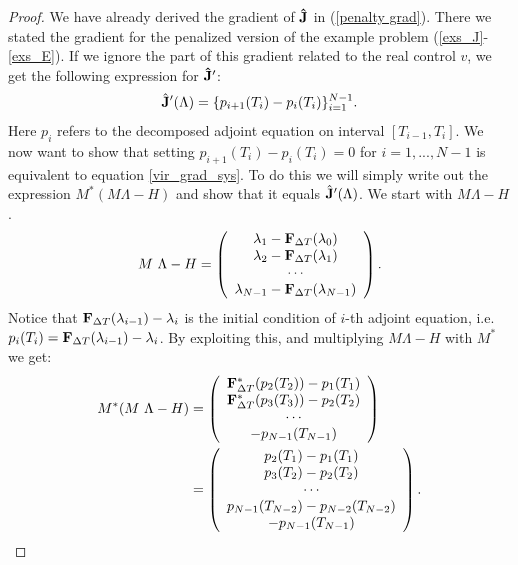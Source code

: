 \begin{proof}
We have already derived the gradient of $\bold{\hat J}$ in (\ref{penalty grad}). There we stated the gradient for the penalized version of the example problem (\ref{exs_J}-\ref{exs_E}). If we ignore the part of this gradient related to the real control $v$, we get the following expression for $\bold{\hat J}'$:
\begin{align*}
\hat{\bold J}'(\Lambda) = \{p_{i+1}(T_i)-p_{i}(T_i)\}_{i=1}^{N-1}.
\end{align*}
Here $p_i$ refers to the decomposed adjoint equation on interval $[T_{i-1},T_{i}]$. We now want to show that setting $p_{i+1}(T_i)-p_{i}(T_i)=0$ for $i=1,...,N-1$ is equivalent to equation \ref{vir_grad_sys}. To do this we will simply write out the expression $M^*(M\Lambda-H)$ and show that it equals $\hat{\bold J}'(\Lambda)$. We start with $M\Lambda-H$.
\begin{align*}
M \ \Lambda - H  = \left( \begin{array}{c}
	\lambda_1-\bold{F}_{\Delta T}(\lambda_0)\\
	\lambda_2-\bold{F}_{\Delta T}(\lambda_1) \\
	\cdots \\
	\lambda_{N-1}-\bold{F}_{\Delta T}(\lambda_{N-1}) 
	\end{array} \right).
\end{align*}
Notice that $\bold{F}_{\Delta T}(\lambda_{i-1})-\lambda_i$ is the initial condition of $i$-th adjoint equation, i.e. $p_i(T_i)=\bold{F}_{\Delta T}(\lambda_{i-1})-\lambda_i$. By exploiting this, and multiplying $M\Lambda-H$ with $M^*$ we get:
\begin{align}
M^* (M \ \Lambda-H)&=
	\left( \begin{array}{c}
	 \bold{F}_{\Delta T}^*(p_2( T_2))-p_1(T_1)\\
	\bold{F}_{\Delta T}^*(p_3( T_3))-p_2(T_2)\\
	\cdots \\
	-p_{N-1}(T_{N-1})
	\end{array} \right)
	\\
	&=\left( \begin{array}{c}
	p_2(T_1)-p_1(T_1)\\
	p_3(T_2)-p_2(T_2)\\
	\cdots \\
	p_{N-1}(T_{N-2})-p_{N-2}(T_{N-2}) \\
	-p_{N-1}(T_{N-1})
	\end{array} \right).
\end{align}

\end{proof}
